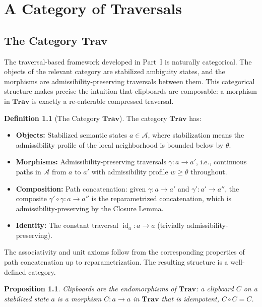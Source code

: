 \documentclass[12pt,oneside]{book}
\theoremstyle{plain}
\newtheorem{proposition}[theorem]{Proposition}
\theoremstyle{definition}
\newtheorem{definition}[theorem]{Definition}
\theoremstyle{plain}
\DeclareMathOperator{\id}{id}
\newcommand{\Trav}{\mathbf{Trav}}
\newcommand{\cA}{\mathcal{A}}
\begin{document}
\chapter{A Category of Traversals}
\label{ch:category}

\section{The Category \texorpdfstring{$\Trav$}{Trav}}

The traversal-based framework developed in Part~I is naturally categorical. The objects of the relevant category are stabilized ambiguity states, and the morphisms are admissibility-preserving traversals between them. This categorical structure makes precise the intuition that clipboards are composable: a morphism in $\Trav$ is exactly a re-enterable compressed traversal.

\begin{definition}[The Category $\Trav$]
The category $\Trav$ has:
\begin{itemize}[noitemsep]
\item \textbf{Objects:} Stabilized semantic states $a \in \cA$, where stabilization means the admissibility profile of the local neighborhood is bounded below by $\theta$.
\item \textbf{Morphisms:} Admissibility-preserving traversals $\gamma : a \to a'$, i.e., continuous paths in $\cA$ from $a$ to $a'$ with admissibility profile $w \geq \theta$ throughout.
\item \textbf{Composition:} Path concatenation: given $\gamma : a \to a'$ and $\gamma' : a' \to a''$, the composite $\gamma' \circ \gamma : a \to a''$ is the reparametrized concatenation, which is admissibility-preserving by the Closure Lemma.
\item \textbf{Identity:} The constant traversal $\id_a : a \to a$ (trivially admissibility-preserving).
\end{itemize}
\end{definition}

The associativity and unit axioms follow from the corresponding properties of path concatenation up to reparametrization. The resulting structure is a well-defined category.

\begin{proposition}
Clipboards are the endomorphisms of $\Trav$: a clipboard $C$ on a stabilized state $a$ is a morphism $C : a \to a$ in $\Trav$ that is idempotent, $C \circ C = C$.
\end{proposition}
\end{document}
